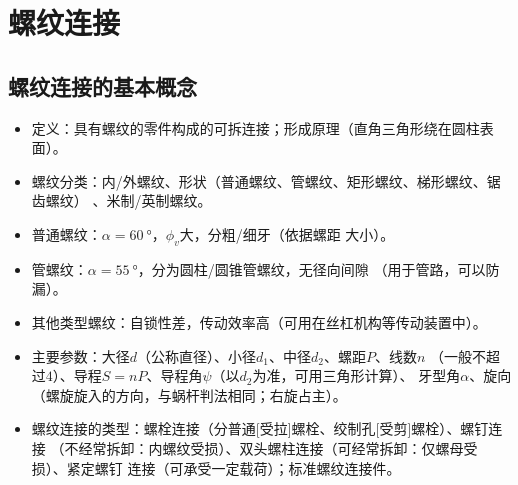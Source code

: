 \documentclass[12pt,a4paper]{article}
\newcommand{\tightlist}{\setlength{\parskip}{0pt}\setlength{\itemsep}{0pt}}
\newcommand{\hint}[1]{\textsf{（#1）}}
\newcommand{\minor}[1]{{\color{gray} #1}}
\begin{document}
\section{螺纹连接}

\subsection{螺纹连接的基本概念}
\begin{itemize}\tightlist
    \item 定义：具有螺纹的零件构成的可拆连接；形成原理\hint{直角三角形绕在圆柱表面}。
    \item 螺纹分类：内/外螺纹、形状\hint{普通螺纹、管螺纹、矩形螺纹、梯形螺纹、锯齿螺纹}
    \minor{、米制/英制螺纹}。
    \item 普通螺纹：$\alpha=\SI{60}{\degree}$，$\phi_v$大，分粗/细牙\hint{依据螺距
    大小}。
    \item \minor{管螺纹：$\alpha=\SI{55}{\degree}$，分为圆柱/圆锥管螺纹，无径向间隙
    \hint{用于管路，可以防漏}。}
    \item \minor{其他类型螺纹：自锁性差，传动效率高\hint{可用在丝杠机构等传动装置中}。}
    \item 主要参数：大径$d$\hint{公称直径}、小径$d_1$、中径$d_2$、螺距$P$、线数$n$
    \hint{一般不超过$4$}、导程$S=nP$、导程角$\psi$\hint{以$d_2$为准，可用三角形计算}、
    牙型角$\alpha$、旋向\hint{螺旋旋入的方向，与蜗杆判法相同；右旋占主}。
    \item 螺纹连接的类型：螺栓连接\hint{分普通[受拉]螺栓、绞制孔[受剪]螺栓}、螺钉连接
    \hint{不经常拆卸：内螺纹受损}、双头螺柱连接\hint{可经常拆卸：仅螺母受损}、紧定螺钉
    连接\hint{可承受一定载荷}；标准螺纹连接件。
\end{itemize}
\end{document}
